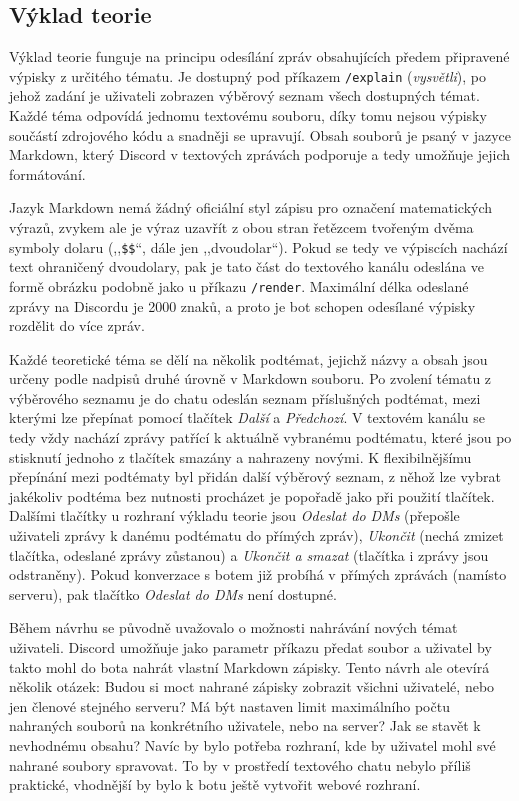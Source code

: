 \documentclass[FM]{tulthesis}
\begin{document}
	\subsection{Výklad teorie}
	
	Výklad teorie funguje na principu odesílání zpráv obsahujících předem připravené výpisky z určitého tématu. Je dostupný pod příkazem \verb|/explain| (\textit{vysvětli}), po jehož zadání je uživateli zobrazen výběrový seznam všech dostupných témat. Každé téma odpovídá jednomu textovému souboru, díky tomu nejsou výpisky součástí zdrojového kódu a snadněji se upravují. Obsah souborů je psaný v jazyce Markdown, který Discord v textových zprávách podporuje a tedy umožňuje jejich formátování.
	
	Jazyk Markdown nemá žádný oficiální styl zápisu pro označení matematických výrazů, zvykem ale je výraz uzavřít z obou stran řetězcem tvořeným dvěma symboly dolaru (,,\verb|$$|``, dále jen ,,dvoudolar``). Pokud se tedy ve výpiscích nachází text ohraničený dvoudolary, pak je tato část do textového kanálu odeslána ve formě obrázku podobně jako u příkazu \verb|/render|. Maximální délka odeslané zprávy na Discordu je 2000 znaků, a proto je bot schopen odesílané výpisky rozdělit do více zpráv. %
	
	Každé teoretické téma se dělí na několik podtémat, jejichž názvy a obsah jsou určeny podle nadpisů druhé úrovně v Markdown souboru. Po zvolení tématu z výběrového seznamu je do chatu odeslán seznam příslušných podtémat, mezi kterými lze přepínat pomocí tlačítek \textit{Další} a \textit{Předchozí}. V textovém kanálu se tedy vždy nachází zprávy patřící k aktuálně vybranému podtématu, které jsou po stisknutí jednoho z tlačítek smazány a nahrazeny novými. K flexibilnějšímu přepínání mezi podtématy byl přidán další výběrový seznam, z něhož lze vybrat jakékoliv podtéma bez nutnosti procházet je popořadě jako při použití tlačítek. Dalšími tlačítky u rozhraní výkladu teorie jsou \textit{Odeslat do DMs} (přepošle uživateli zprávy k danému podtématu do přímých zpráv), \textit{Ukončit} (nechá zmizet tlačítka, odeslané zprávy zůstanou) a \textit{Ukončit a smazat} (tlačítka i zprávy jsou odstraněny). Pokud konverzace s botem již probíhá v přímých zprávách (namísto serveru), pak tlačítko \textit{Odeslat do DMs} není dostupné.
	
	Během návrhu se původně uvažovalo o možnosti nahrávání nových témat uživateli. Discord umožňuje jako parametr příkazu předat soubor a uživatel by takto mohl do bota nahrát vlastní Markdown zápisky. Tento návrh ale otevírá několik otázek: Budou si moct nahrané zápisky zobrazit všichni uživatelé, nebo jen členové stejného serveru? Má být nastaven limit maximálního počtu nahraných souborů na konkrétního uživatele, nebo na server? Jak se stavět k nevhodnému obsahu? Navíc by bylo potřeba rozhraní, kde by uživatel mohl své nahrané soubory spravovat. To by v prostředí textového chatu nebylo příliš praktické, vhodnější by bylo k botu ještě vytvořit webové rozhraní.
	
\end{document}

